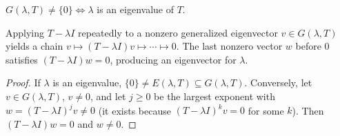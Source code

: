 \documentclass[10pt]{scrartcl}
\begin{document}
\begin{proposition*}[Prop.~71]\hypertarget{prop-71}{}\label{prop-71}
  $G(\lambda,T)\ne\{0\}\iff\lambda$ is an eigenvalue of $T$.
\end{proposition*}
\begin{ideabox}
Applying $T-\lambda I$ repeatedly to a nonzero generalized eigenvector $v\in G(\lambda,T)$ yields a chain $v\mapsto(T-\lambda I)v\mapsto\cdots\mapsto0$. The last nonzero vector $w$ before $0$ satisfies $(T-\lambda I)w=0$, producing an eigenvector for $\lambda$.
\end{ideabox}
\begin{proof}
  If $\lambda$ is an eigenvalue, $\{0\}\ne E(\lambda,T)\subseteq G(\lambda,T)$. Conversely, let $v\in G(\lambda,T)$, $v\ne0$, and let $j\ge0$ be the largest exponent with $w=(T-\lambda I)^jv\ne0$ (it exists because $(T-\lambda I)^kv=0$ for some $k$). Then $(T-\lambda I)w=0$ and $w\ne0$.
\end{proof}
\begin{fig}
\end{fig}
\end{document}
